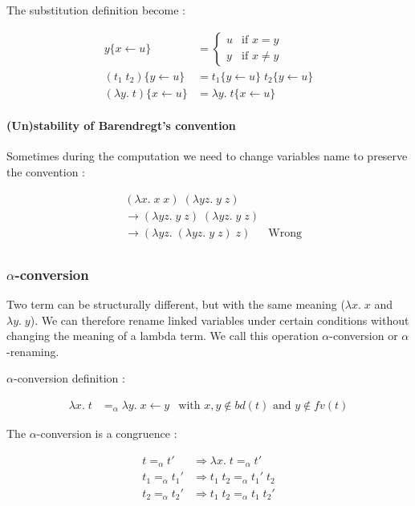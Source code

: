   The substitution definition become :

  \begin{align*}
    y\{x \leftarrow u\} &= \begin{cases}
      u & \text{if } x = y \\
      y & \text{if } x \not = y
    \end{cases} \\
    (t_1\; t_2)\{y \leftarrow u\} &= t_1\{y \leftarrow u\}\; t_2\{y \leftarrow
    u\} \\
    (\lambda y.\;t)\{x \leftarrow u\} &= \lambda y.\; t\{x \leftarrow u\}
  \end{align*}

  \paragraph{(Un)stability of Barendregt's convention}
  Sometimes during the computation we need to change variables name to preserve
  the convention :

  \begin{align*}
    &(\lambda x.\;x\;x)\;(\lambda yz.\;y\;z)\\
    &\to (\lambda yz.\;y\;z)\;(\lambda yz.\;y\;z)\\
    &\to (\lambda yz.\;(\lambda yz.\;y\;z)\;z) & \text{Wrong}\\
  \end{align*}

  \subsubsection{$\alpha$-conversion}

  Two term can be structurally different, but with the same meaning ($\lambda
  x.\; x$ and $\lambda y.\; y$). We can therefore rename linked variables under
  certain conditions without changing the meaning of a lambda term. We call this
  operation $\alpha$-conversion or $\alpha$-renaming.

  $\alpha$-conversion definition :

  \begin{align*}
    \lambda x.\; t &=_\alpha \lambda y.\;{x \leftarrow y} & \text{with } x,y
      \not \in bd(t) \text{ and } y \not \in fv(t)
  \end{align*}

  The $\alpha$-conversion is a congruence :

  \begin{align*}
    t =_\alpha t' &\Rightarrow \lambda x.\;t =_\alpha t' \\
    t_1 =_\alpha t_1' &\Rightarrow t_1\;t_2 =_\alpha t_1'\;t_2 \\
    t_2 =_\alpha t_2' &\Rightarrow t_1\;t_2 =_\alpha t_1\;t_2' \\
  \end{align*}


